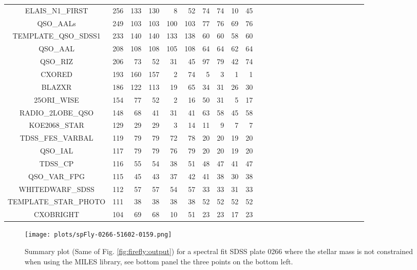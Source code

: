 \documentclass[onecolumn]{aa}
\begin{document}
\begin{center}
\begin{longtable}{c r rrrr rrrr rrrrr rrrrr rrrrr}
ELAIS\_N1\_FIRST 	& 256    & 133 & 130 & 8 & 52 		  & 74 & 74 & 10 & 45 \\ 
QSO\_AALs 		& 249    & 103 & 103 & 100 & 103 	  & 77 & 76 & 69 & 76 \\ 
TEMPLATE\_QSO\_SDSS1 	& 233    & 140 & 140 & 133 & 138 	  & 60 & 60 & 58 & 60 \\ 
QSO\_AAL 		& 208    & 108 & 108 & 105 & 108 	  & 64 & 64 & 62 & 64 \\ 
QSO\_RIZ 		& 206    & 73 & 52 & 31 & 45 		  & 97 & 79 & 42 & 74 \\ 
CXORED 			& 193    & 160 & 157 & 2 & 74 		  & 5 & 3 & 1 & 1 \\ 
BLAZXR 			& 186    & 122 & 113 & 19 & 65 		  & 34 & 31 & 26 & 30 \\ 
25ORI\_WISE 		& 154    & 77 & 52 & 2 & 16 		  & 50 & 31 & 5 & 17 \\ 
RADIO\_2LOBE\_QSO 	& 148    & 68 & 41 & 31 & 41		  & 63 & 58 & 45 & 58 \\ 
KOE2068\_STAR 		& 129    & 29 & 29 & 3 & 14 		  & 11 & 9 & 7 & 7 \\ 
TDSS\_FES\_VARBAL 	& 119    & 79 & 79 & 72 & 78 		  & 20 & 20 & 19 & 20 \\ 
QSO\_IAL 		& 117    & 79 & 79 & 76 & 79 		  & 20 & 20 & 19 & 20 \\ 
TDSS\_CP 		& 116    & 55 & 54 & 38 & 51 		  & 48 & 47 & 41 & 47 \\ 
QSO\_VAR\_FPG 		& 115    & 45 & 43 & 37 & 42 		  & 41 & 38 & 30 & 38 \\ 
WHITEDWARF\_SDSS	& 112    & 57 & 57 & 54 & 57 		  & 33 & 33 & 31 & 33 \\ 
TEMPLATE\_STAR\_PHOTO 	& 111    & 38 & 38 & 38 & 38 		  & 52 & 52 & 52 & 52 \\ 
CXOBRIGHT 		& 104    & 69 & 68 & 10 & 51 		  & 23 & 23 & 17 & 23 \\ 
\hline
\end{longtable}
\end{center}

\begin{figure*}
\begin{center}
\caption{\label{fig:firefly:output:plate:unconstrained}
Summary plot (Same of Fig. \ref{fig:firefly:output}) for a spectral fit SDSS plate 0266 where the stellar mass is not constrained when using the MILES library, see bottom panel the three points on the bottom left. }
\texttt{[image: plots/spFly-0266-51602-0159.png]}
\end{center}
\end{figure*}
\end{document}
